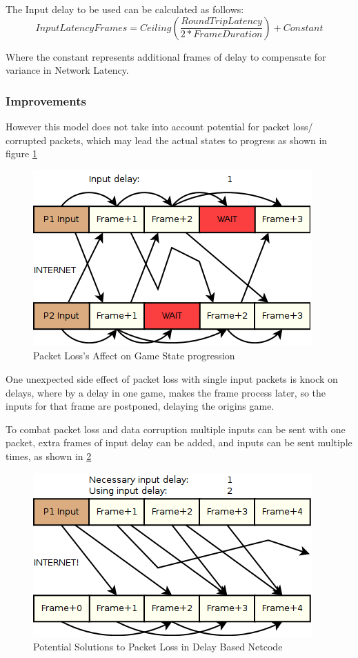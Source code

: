 \documentclass{entcs}
\begin{document}
The Input delay to be used can be calculated as follows:
\[InputLatencyFrames = Ceiling( \frac{RoundTripLatency}{2 * FrameDuration} ) + Constant\]

Where the constant represents additional frames of delay to compensate for variance in Network Latency.

\subsubsection{Improvements}
However this model does not take into account potential for packet loss/ corrupted packets, which may lead the actual states to progress as shown in figure \ref{fig:PacketLossEffect}

\begin{figure}[h]
\centering
\includegraphics{PacketLossEffect}
\caption{Packet Loss's Affect on Game State progression \cite{FightingGameNetworking}}
\label{fig:PacketLossEffect}
\end{figure}

One unexpected side effect of packet loss with single input packets is knock on delays, where by a delay in one game, makes the frame process later, so the inputs for that frame are postponed, delaying the origins game.

To combat packet loss and data corruption multiple inputs can be sent with one packet, extra frames of input delay can be added, and inputs can be sent multiple times, as shown in \ref{fig:PacketLossSoultions}

\begin{figure}[h]
\centering
\includegraphics{PacketLossSoultions}
\caption{Potential Solutions to Packet Loss in Delay Based Netcode \cite{FightingGameNetworking}}
\label{fig:PacketLossSoultions}
\end{figure}
\end{document}
